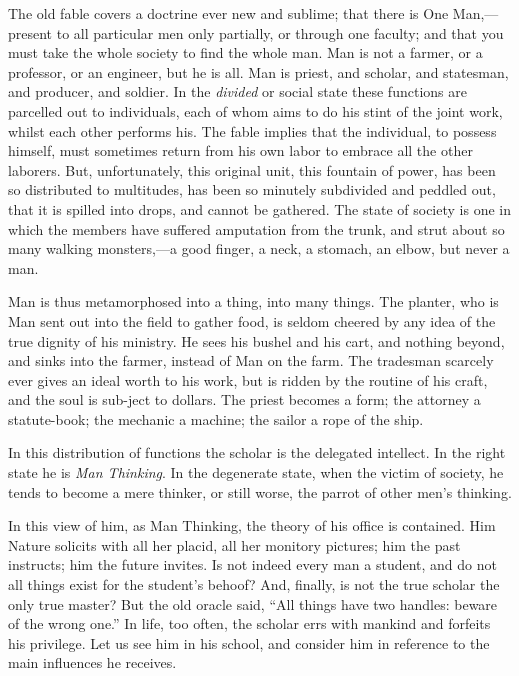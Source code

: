 The old fable covers a doctrine ever new and sublime; that there is
One Man,---pre\-sent to all particular men only partially, or through
one faculty; and that you must take the whole society to find the
whole man. Man is not a farmer,  or a professor, or an
engineer, but he is all. Man is priest, and scholar, and statesman,
and producer, and soldier. In the \textit{divided} or social state
these functions are parcelled out to individuals, each of whom aims to
do his stint of the joint work, whilst each other performs his. The
fable implies that the individual, to possess himself, must sometimes
return from his own labor to embrace all the other laborers. But,
unfortunately, this original unit, this fountain of power, has been so
distributed to multitudes, has been so minutely subdivided and peddled
out, that it is spilled into drops, and cannot be gathered. The state
of society is one in which the members have suffered amputation from
the trunk, and strut about so many walking monsters,---a good finger,
a neck, a stomach, an elbow, but never a man.

Man is thus metamorphosed into a thing, into many things. The planter,
who is Man sent out into the field to gather food, is seldom cheered
by any idea of the true dignity of his ministry. He sees his bushel
and his cart, and nothing beyond, and sinks into the farmer, instead
of Man on the farm. The tradesman scarcely ever gives an ideal worth
to his work, but is ridden by the routine of his craft, and the soul
is sub-ject to dollars. The priest becomes a form; the
attorney a statute-book; the mechanic a machine; the sailor a rope of
the ship.

In this distribution of functions the scholar is the delegated
intellect. In the right state he is \textit{Man Thinking}. In the
degenerate state, when the victim of society, he tends to become a
mere thinker, or still worse, the parrot of other men's thinking.

In this view of him, as Man Thinking, the theory of his office is
contained. Him Nature solicits with all her placid, all her monitory
pictures; him the past instructs; him the future invites. Is not
indeed every man a student, and do not all things exist for the
student's behoof? And, finally, is not the true scholar the only true
master? But the old oracle said, ``All things have two handles: beware
of the wrong one.'' In life, too often, the scholar errs with mankind
and forfeits his privilege. Let us see him in his school, and consider
him in reference to the main influences he receives.

